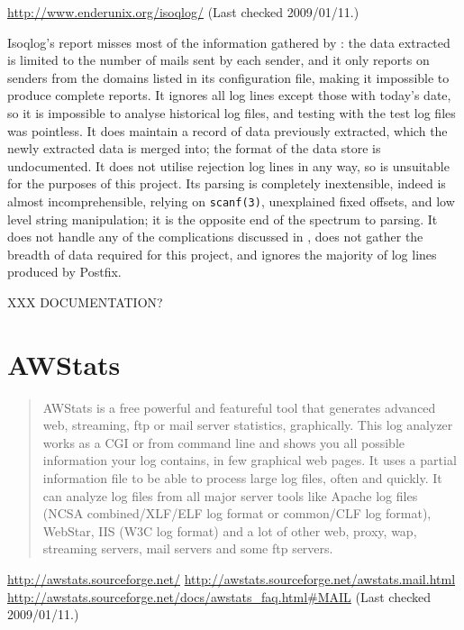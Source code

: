 \noindent{}\url{http://www.enderunix.org/isoqlog/} \newline{}
(Last checked 2009/01/11.)

Isoqlog's report misses most of the information gathered by \parsername{}:
the data extracted is limited to the number of mails sent by each sender,
and it only reports on senders from the domains listed in its configuration
file, making it impossible to produce complete reports.  It ignores all log
lines except those with today's date, so it is impossible to analyse
historical log files, and testing with the \numberOFlogFILES{} test log
files was pointless.  It does maintain a record of data previously
extracted, which the newly extracted data is merged into; the format of the
data store is undocumented.  It does not utilise rejection log lines in any
way, so is unsuitable for the purposes of this project.  Its parsing is
completely inextensible, indeed is almost incomprehensible, relying on
\texttt{scanf(3)}, unexplained fixed offsets, and low level string
manipulation; it is the opposite end of the spectrum to \parsernames{}
parsing.  It does not handle any of the complications discussed in
, does not gather the breadth of data required
for this project, and ignores the majority of log lines produced by
Postfix.

XXX DOCUMENTATION\@?

\section{AWStats}

\begin{quotation}

    AWStats is a free powerful and featureful tool that generates advanced
    web, streaming, ftp or mail server statistics, graphically. This log
    analyzer works as a CGI or from command line and shows you all possible
    information your log contains, in few graphical web pages. It uses a
    partial information file to be able to process large log files, often
    and quickly. It can analyze log files from all major server tools like
    Apache log files (NCSA combined/XLF/ELF log format or common/CLF log
    format), WebStar, IIS (W3C log format) and a lot of other web, proxy,
    wap, streaming servers, mail servers and some ftp servers.

\end{quotation}

\noindent{}\url{http://awstats.sourceforge.net/} \newline{}
\url{http://awstats.sourceforge.net/awstats.mail.html} \newline{}
\url{http://awstats.sourceforge.net/docs/awstats_faq.html#MAIL} \newline{}
(Last checked 2009/01/11.)

